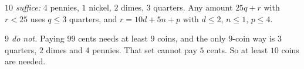 \emph{$10$ suffice:} $4$ pennies, $1$ nickel, $2$ dimes, $3$ quarters. Any amount $25q+r$ with $r<25$ uses $q\le3$ quarters, and $r=10d+5n+p$ with $d\le2$, $n\le1$, $p\le4$.

\emph{$9$ do not.} Paying $99$ cents needs at least $9$ coins, and the only $9$-coin way is $3$ quarters, $2$ dimes and $4$ pennies. That set cannot pay $5$ cents. So at least $\boxed{10}$ coins are needed.

